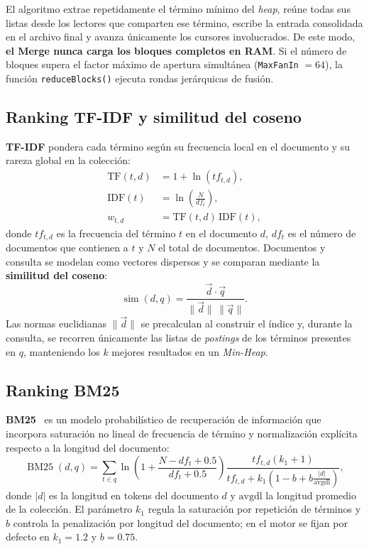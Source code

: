 \documentclass[11pt,a4paper]{article}
\begin{document}
El algoritmo extrae repetidamente el término mínimo del \emph{heap}, reúne todas sus listas desde los lectores que comparten ese término, escribe la entrada consolidada en el archivo final y avanza únicamente los cursores involucrados. De este modo, \textbf{el Merge nunca carga los bloques completos en RAM}. Si el número de bloques supera el factor máximo de apertura simultánea (\texttt{MaxFanIn} $= 64$), la función \texttt{reduceBlocks()} ejecuta rondas jerárquicas de fusión.

\subsection{Ranking TF-IDF y similitud del coseno}

\textbf{TF-IDF} pondera cada término según su frecuencia local en el documento y su rareza global en la colección:
\begin{align*}
  \mathrm{TF}(t,d) &= 1 + \ln(tf_{t,d}), \\
  \mathrm{IDF}(t)  &= \ln\!\left(\frac{N}{df_t}\right), \\
  w_{t,d}          &= \mathrm{TF}(t,d)\,\mathrm{IDF}(t),
\end{align*}
donde $tf_{t,d}$ es la frecuencia del término $t$ en el documento $d$, $df_t$ es el número de documentos que contienen a $t$ y $N$ el total de documentos. Documentos y consulta se modelan como vectores dispersos y se comparan mediante la \textbf{similitud del coseno}:
\[
\operatorname{sim}(d,q) = \frac{\vec{d}\cdot\vec{q}}{\|\vec{d}\|\,\|\vec{q}\|}.
\]
Las normas euclidianas $\|\vec{d}\|$ se precalculan al construir el índice y, durante la consulta, se recorren únicamente las listas de \emph{postings} de los términos presentes en $q$, manteniendo los $k$ mejores resultados en un \emph{Min-Heap}.

\subsection{Ranking BM25}

\textbf{BM25}~\cite{robertson2009} es un modelo probabilístico de recuperación de información que incorpora saturación no lineal de frecuencia de término y normalización explícita respecto a la longitud del documento:
\[
\operatorname{BM25}(d,q) = \sum_{t \in q} \ln\!\left(1 + \frac{N - df_t + 0.5}{df_t + 0.5}\right)
\frac{tf_{t,d}(k_1 + 1)}{tf_{t,d} + k_1\left(1 - b + b\frac{|d|}{\mathrm{avgdl}}\right)},
\]
donde $|d|$ es la longitud en tokens del documento $d$ y $\mathrm{avgdl}$ la longitud promedio de la colección. El parámetro $k_1$ regula la saturación por repetición de términos y $b$ controla la penalización por longitud del documento; en el motor se fijan por defecto en $k_1 = 1.2$ y $b = 0.75$.
\end{document}
